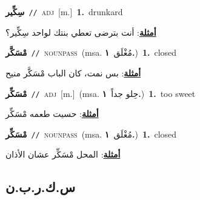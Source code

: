 \documentclass[10pt,a4paper,twoside]{article} %
\begin{document}
\begin{multicols}{2}
{\setlength\topsep{0pt}\textbf{\foreignlanguage{arabic}{سِكِّير}}\ {\color{gray}\texttt{//}\color{black}}\ \textsc{adj}\ [m.]\ \textbf{1.}~drunkard\  \begin{flushright}\color{gray}\foreignlanguage{arabic}{\textbf{\underline{\foreignlanguage{arabic}{أمثلة}}}: أنت بترضى تعطي بنتك لواحد سِكِّير؟}\end{flushright}\color{black}} \vspace{2mm}

{\setlength\topsep{0pt}\textbf{\foreignlanguage{arabic}{مْسَكَّر}}\ {\color{gray}\texttt{//}\color{black}}\ \textsc{noun\textunderscore pass}\ \color{gray}(msa. \foreignlanguage{arabic}{مُغْلَق}~\foreignlanguage{arabic}{\textbf{١.}})\color{black}\ \textbf{1.}~closed\  \begin{flushright}\color{gray}\foreignlanguage{arabic}{\textbf{\underline{\foreignlanguage{arabic}{أمثلة}}}: بس نمت، كان الباب مْسَكَّر منيح}\end{flushright}\color{black}} \vspace{2mm}

{\setlength\topsep{0pt}\textbf{\foreignlanguage{arabic}{مْسَكِّر}}\ {\color{gray}\texttt{//}\color{black}}\ \textsc{adj}\ [m.]\ \color{gray}(msa. \foreignlanguage{arabic}{حِلو جداً}~\foreignlanguage{arabic}{\textbf{١.}})\color{black}\ \textbf{1.}~too sweet\  \begin{flushright}\color{gray}\foreignlanguage{arabic}{\textbf{\underline{\foreignlanguage{arabic}{أمثلة}}}: حسيت طعمه مْسَكِّر}\end{flushright}\color{black}} \vspace{2mm}

{\setlength\topsep{0pt}\textbf{\foreignlanguage{arabic}{مْسَكِّر}}\ {\color{gray}\texttt{//}\color{black}}\ \textsc{noun\textunderscore pass}\ \color{gray}(msa. \foreignlanguage{arabic}{مُغْلَق}~\foreignlanguage{arabic}{\textbf{١.}})\color{black}\ \textbf{1.}~closed\  \begin{flushright}\color{gray}\foreignlanguage{arabic}{\textbf{\underline{\foreignlanguage{arabic}{أمثلة}}}: المحل مْسَكِّر عشان الأذان}\end{flushright}\color{black}} \vspace{2mm}

\vspace{-3mm}
\subsection*{\color{blue}\foreignlanguage{arabic}{س.ك.ر.ب.ن}\color{blue}{ (ntws)}} 


\end{multicols}
\end{document}

